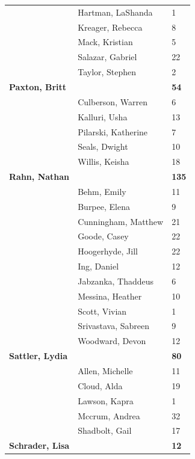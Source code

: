 \documentclass{article}\usepackage[]{graphicx}\usepackage[]{color}
\begin{document}
{\begin{longtable} { >{\raggedright}p{}|p{}p{}}
   & Hartman, LaShanda & 1 \\ 
   & Kreager, Rebecca & 8 \\ 
   \rowcolor[gray]{0.90} & Mack, Kristian & 5 \\ 
   \rowcolor[gray]{0.90} & Salazar, Gabriel & 22 \\ 
   \rowcolor[gray]{0.90} & Taylor, Stephen & 2 \\ 
  \textbf{Paxton, Britt} &  & \hspace{2cm}\textbf{54} \\ 
   & Culberson, Warren & 6 \\ 
   & Kalluri, Usha & 13 \\ 
   \rowcolor[gray]{0.90} & Pilarski, Katherine & 7 \\ 
   \rowcolor[gray]{0.90} & Seals, Dwight & 10 \\ 
   \rowcolor[gray]{0.90} & Willis, Keisha & 18 \\ 
  \textbf{Rahn, Nathan} &  & \hspace{2cm}\textbf{135} \\ 
   & Behm, Emily & 11 \\ 
   & Burpee, Elena & 9 \\ 
   \rowcolor[gray]{0.90} & Cunningham, Matthew & 21 \\ 
   \rowcolor[gray]{0.90} & Goode, Casey & 22 \\ 
   \rowcolor[gray]{0.90} & Hoogerhyde, Jill & 22 \\ 
   & Ing, Daniel & 12 \\ 
   & Jabzanka, Thaddeus & 6 \\ 
   & Messina, Heather & 10 \\ 
   \rowcolor[gray]{0.90} & Scott, Vivian & 1 \\ 
   \rowcolor[gray]{0.90} & Srivastava, Sabreen & 9 \\ 
   \rowcolor[gray]{0.90} & Woodward, Devon & 12 \\ 
  \textbf{Sattler, Lydia} &  & \hspace{2cm}\textbf{80} \\ 
   & Allen, Michelle & 11 \\ 
   & Cloud, Alda & 19 \\ 
   \rowcolor[gray]{0.90} & Lawson, Kapra & 1 \\ 
   \rowcolor[gray]{0.90} & Mccrum, Andrea & 32 \\ 
   \rowcolor[gray]{0.90} & Shadbolt, Gail & 17 \\ 
  \textbf{Schrader, Lisa} &  & \hspace{2cm}\textbf{12} \\ 

\end{longtable}}
\end{document}
